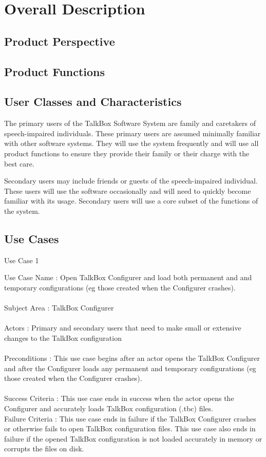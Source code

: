 \chapter{Overall Description}
\label{Overall Description}

\section{Product Perspective}

\section{Product Functions}


\section{User Classes and Characteristics}
The primary users of the TalkBox Software System are family and caretakers of speech-impaired individuals. These primary users are assumed minimally familiar with other software systems. They will use the system frequently and will use all product functions to ensure they provide their family or their charge with the best care.

Secondary users may include friends or guests of the speech-impaired individual. These users will use the software occasionally and will need to quickly become familiar with its usage. Secondary users will use a core subset of the functions of the system.

\section{Use Cases}
 Use Case 1
 
Use Case Name : Open TalkBox Configurer and load both permanent and and temporary configurations (eg those created when the Configurer crashes). \\ \\
Subject Area :  TalkBox Configurer \\ \\
Actors : Primary and secondary users that need to make small or extensive changes to the TalkBox configuration \\ \\
Preconditions : This use case begins after an actor opens the TalkBox Configurer and after the Configurer loads any permanent and temporary configurations (eg those created when the Configurer crashes). \\  \\
Success Criteria : This use case ends in success when the actor opens the Configurer and accurately loads TalkBox configuration (.tbc) files.\\
Failure Criteria : This use case ends in failure if the TalkBox Configurer crashes or otherwise fails to open TalkBox configuration files. This use case also ends in failure if the opened TalkBox configuration is not loaded accurately in memory or corrupts the files on disk.  \\ \\

